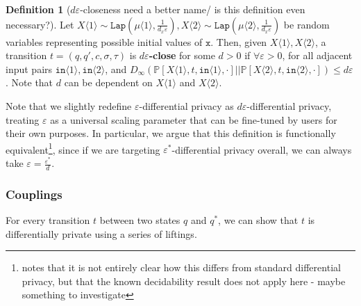 \documentclass[12pt]{article}
\newcommand{\PP}{\mathbb{P}}
\newcommand{\brangle}[1]{\langle #1 \rangle}
\newcommand{\Lap}{\texttt{Lap}}
\theoremstyle{definition}
\newtheorem{defn}[thm]{Definition}
\begin{document}
\begin{defn}[$d\varepsilon$-closeness{\color{red} need a better name/ is this definition even necessary?}]
    Let $X\brangle{1}\sim \Lap(\mu\brangle{1}, \frac{1}{d_x\varepsilon}), X\brangle{2}\sim\Lap(\mu\brangle{2}, \frac{1}{d_x\varepsilon})$ be random variables representing possible initial values of $\texttt{x}$. 
    Then, given $X\brangle{1}, X\brangle{2}$, a transition $t=(q, q', c, \sigma, \tau)$ is \textbf{$d\varepsilon$-close} for some $d>0$ if $\forall \varepsilon> 0$, for all adjacent input pairs $\texttt{in}\brangle{1}, \texttt{in}\brangle{2}$, and $D_{\infty}(\PP[X\brangle{1}, t, \texttt{in}\brangle{1}, \cdot]||\PP[X\brangle{2}, t, \texttt{in}\brangle{2}, \cdot])\leq d\varepsilon$. Note that $d$ can be dependent on $X\brangle{1}$ and $X\brangle{2}$.
\end{defn}

Note that we slightly redefine $\varepsilon$-differential privacy as $d\varepsilon$-differential privacy, treating $\varepsilon$ as a universal scaling parameter that can be fine-tuned by users for their own purposes. 
In particular, we argue that this definition is functionally equivalent\footnote{\cite{chadhaLinearTimeDecidability2021} notes that it is not entirely clear how this differs from standard differential privacy, but that the known decidability result does not apply here - {\color{red} maybe something to investigate}}, since if we are targeting $\varepsilon^*$-differential privacy overall, we can always take $\varepsilon = \frac{\varepsilon^*}{d}$.

\subsubsection{Couplings}

For every transition $t$ between two states $q$ and $q^*$, we can show that $t$ is differentially private using a series of liftings. 
\end{document}
